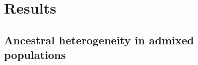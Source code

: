 \documentclass[12pt]{article}
\newcommand{\edit}[1]{{\color{red}{#1}}}
\newcommand{\add}[1]{{\color{red}{[... #1 ...]}}}
\begin{document}
%








\section{Results}

\subsection{Ancestral heterogeneity in admixed populations}
\end{document}
